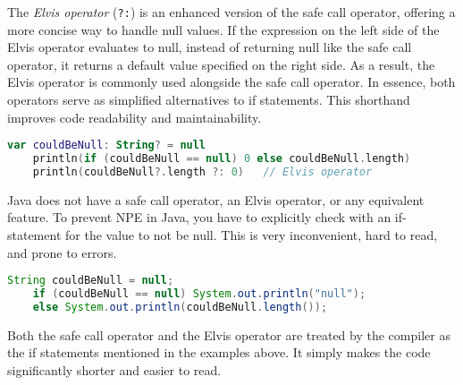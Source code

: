 \documentclass[a4paper, 11pt]{article}
\begin{document}
  The \textit{Elvis operator} (\texttt{?:}) is an enhanced version of the safe call operator, offering a more concise way to handle null values. If the expression on the left side of the Elvis operator evaluates to null, instead of returning null like the safe call operator, it returns a default value specified on the right side. As a result, the Elvis operator is commonly used alongside the safe call operator. In essence, both operators serve as simplified alternatives to if statements. This shorthand improves code readability and maintainability. %
  \begin{lstlisting}[language=Kotlin,title={Using the Elvis operator in comparison to an if statement}]
    var couldBeNull: String? = null
    println(if (couldBeNull == null) 0 else couldBeNull.length)
    println(couldBeNull?.length ?: 0)   // Elvis operator
  \end{lstlisting}
  \hfill \break
  Java does not have a safe call operator, an Elvis operator, or any equivalent feature. To prevent NPE in Java, you have to explicitly check with an if-statement for the value to not be null. This is very inconvenient, hard to read, and prone to errors.
  \begin{lstlisting}[language=Java,title={Prevent NPE in Java}]
    String couldBeNull = null;
    if (couldBeNull == null) System.out.println("null");
    else System.out.println(couldBeNull.length());
  \end{lstlisting}
  \hfill \break
  Both the safe call operator and the Elvis operator are treated by the compiler as the if statements mentioned in the examples above. It simply makes the code significantly shorter and easier to read. %
\end{document}
